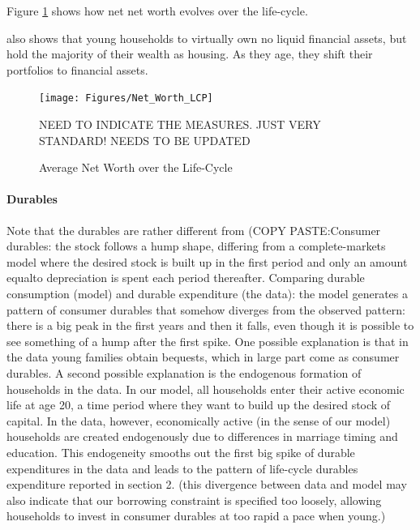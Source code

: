 \documentclass[a4paper,12pt]{article}
\begin{document}
Figure \ref{Net_LCP} shows how net net worth evolves over the life-cycle. 

\cite{yang2009} also shows that young households to virtually own no liquid financial assets, but hold the majority of their wealth as housing. As they age, they shift their portfolios to financial assets.

\begin{figure}[!htbp]
\caption{Average Net Worth over the Life-Cycle} 
\label{Net_LCP}	%
\centering
\texttt{[image: Figures/Net\_Worth\_LCP]}  %

\begin{minipage}{0.8\linewidth}
\footnotesize{NEED TO INDICATE THE MEASURES. JUST VERY STANDARD! NEEDS TO BE UPDATED}
\end{minipage}

\end{figure}

\paragraph{Durables}
Note that the durables are rather different from \citep{FV&K2011} (COPY PASTE:Consumer durables: the stock follows a hump shape, differing from a complete-markets model where the desired stock is built up in the first period and only an amount equalto depreciation is spent each period thereafter. 
Comparing durable consumption (model) and durable expenditure (the data): the model generates a pattern of consumer durables that somehow diverges from the observed pattern: there is a big peak in the first years and then it falls, even though it is possible to see something of a hump after the first spike. 
One possible explanation is that in the data young families obtain bequests, which in large part come as consumer durables. 
A second possible explanation is the endogenous formation of households in the data. In our model, all households enter their active economic life at age 20, a time period where they want to build up the desired stock of capital. In the data, however, economically active (in the sense of our model) households are created endogenously due to differences in marriage timing and education. This endogeneity smooths out the first big spike of durable expenditures in the data and leads to the pattern of life-cycle durables expenditure reported in section 2. (this divergence between data and model may also indicate that our borrowing constraint is specified too loosely, allowing households to invest in consumer durables at too rapid a pace when young.)
\end{document}
